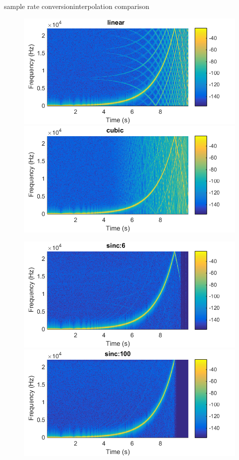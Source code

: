 	\begin{frame}{sample rate conversion}{interpolation comparison}
        \begin{figure}
            \hspace*{-5mm}
            \includegraphics[scale=.5]{graph/src_sine_1}
            \includegraphics[scale=.5]{graph/src_sine_2}

            \hspace*{-5mm}
            \includegraphics[scale=.5]{graph/src_sine_3}
            \includegraphics[scale=.5]{graph/src_sine_4}
        \end{figure}
	\end{frame}
	
